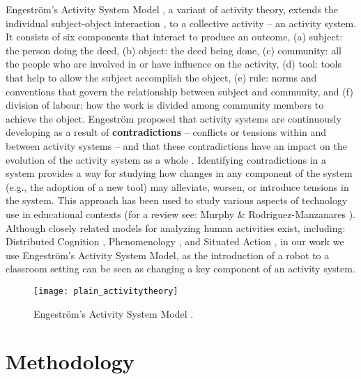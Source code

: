 Engeström's Activity System Model \cite{engestrom1987}, a variant of activity theory, extends the individual subject-object interaction \cite{leontiev1978}, to a collective activity -- an activity system. It consists of six components that interact to produce an outcome, (a) subject: the person doing the deed, (b) object: the deed being done, (c) community: all the people who are involved in or have influence on the activity, (d) tool: tools that help to allow the subject accomplish the object, (e) rule: norms and conventions that govern the relationship between subject and community, and (f) division of labour: how the work is divided among community members to achieve the object. Engeström proposed that activity systems are continuously developing as a result of \textbf{contradictions} -- conflicts or tensions within and between activity systems -- and that these contradictions have an impact on the evolution of the activity system as a whole \cite{Engestrom2001}. Identifying contradictions in a system provides a way for studying how changes in any component of the system (e.g., the adoption of a new tool) may alleviate, worsen, or introduce tensions in the system. This approach has been used to study various aspects of technology use in educational contexts (for a review see: Murphy \& Rodriguez-Manzanares \cite{murphy2008using}). Although closely related models for analyzing human activities exist, including: Distributed Cognition \cite{Hollan2000}, Phenomenology \cite{Winograd1987}, and Situated Action \cite{Suchman1987}, in our work we use Engeström's Activity System Model, as the introduction of a robot to a classroom setting can be seen as changing a key component of an activity system.\\
 

\begin{figure}
    \centering
    \texttt{[image: plain\_activitytheory]}
    \caption{Engeström’s Activity System Model \cite{engestrom1987}.}
    \label{fig:my_label}
\end{figure}


\section{Methodology}
\label{sec:6}

